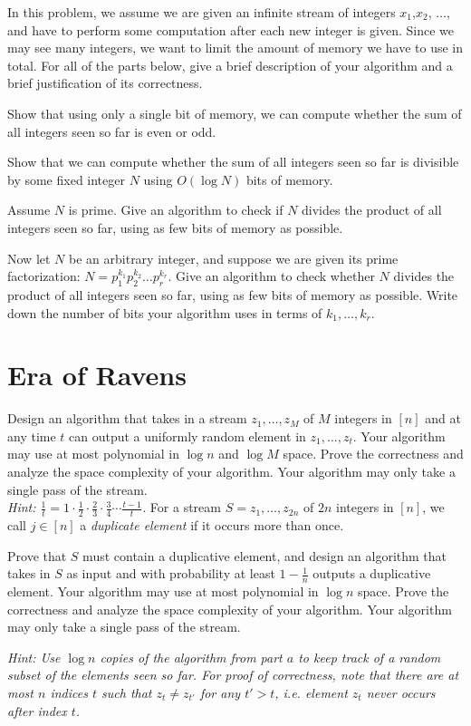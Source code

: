 \documentclass{article}
\begin{document}
In this problem, we assume we are given an infinite stream of integers $x_1$,$x_2$, $\dots$, and have to perform some computation after each new integer is given.
Since we may see many integers, we want to limit the amount of memory we have to use in total.
For all of the parts below, give a brief description of your algorithm and a brief justification of its correctness.

\begin{subparts}
\subpart Show that using only a single bit of memory, we can compute whether the sum of all integers seen so far is even or odd.

\subpart Show that we can compute whether the sum of all integers seen so far is divisible by some fixed integer $N$ using $O(\log N)$ bits of memory.

\subpart Assume $N$ is prime.
Give an algorithm to check if $N$ divides the product of all integers seen so far, using as few bits of memory as possible.

\subpart Now let $N$ be an arbitrary integer, and suppose we are given its prime factorization: $N = p_1^{k_1}p_2^{k_2}\dots p_r^{k_r}$.
Give an algorithm to check whether $N$ divides the product of all integers seen so far, using as few bits of memory as possible.
Write down the number of bits your algorithm uses in terms of $k_{1},\ldots,k_{r}$.

\end{subparts}

\section{Era of Ravens}
\begin{subparts}
    \subpart Design an algorithm that takes in a stream $z_1,\dots,z_M$ of $M$ integers in $[n]$ and at any time $t$ can output a uniformly random element in $z_1,\dots,z_t$.  Your algorithm may use at most polynomial in $\log n$ and $\log M$ space.  Prove the correctness and analyze the space complexity of your algorithm.  Your algorithm may only take a single pass of the stream.\\
    \emph{Hint: $\frac{1}{t}=1\cdot\frac{1}{2}\cdot\frac{2}{3}\cdot\frac{3}{4}\cdots\frac{t-1}{t}$.}
    \subpart For a stream $S=z_1,\dots,z_{2n}$ of $2n$ integers in $[n]$, we call $j\in[n]$ a \emph{duplicate element} if it occurs more than once.
	
	Prove that $S$ must contain a duplicative element, and design an algorithm that takes in $S$ as input and with probability at least $1-\frac{1}{n}$ outputs a duplicative element.  Your algorithm may use at most polynomial in $\log n$ space.  Prove the correctness and analyze the space complexity of your algorithm.  Your algorithm may only take a single pass of the stream.
	
	\emph{Hint: Use $\log n$ copies of the algorithm from part $a$ to keep track of a random subset of the elements seen so far. For proof of correctness, note that there are at most $n$ indices $t$ such that $z_t \neq z_{t'}$ for any $t' > t$, i.e. element $z_t$ never occurs after index $t$.}
\end{subparts}
\end{document}
